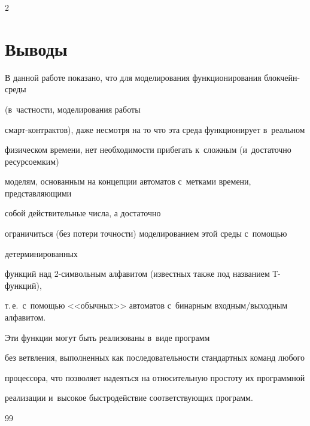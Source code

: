 \begin{multicols}{2}
\vspace*{-9pt}








\section{Выводы}





\vspace*{-2pt}





В данной работе показано, что для моделирования функционирования блок\-чейн-сре\-ды 


(в~част\-ности, моделирования работы


смарт-кон\-трак\-тов), даже несмотря на то что эта среда функционирует в~реальном


физическом времени, нет не\-об\-хо\-ди\-мости прибегать к~сложным (и~достаточно ресурсоемким)


моделям, основанным на концепции автоматов с~метками времени, представляющими 


собой действительные числа, а достаточно


ограничиться (без потери точности) моделированием этой среды с~помощью 


 детерминированных


функций над \mbox{2-сим}\-воль\-ным алфавитом (известных также под названием Т-функ\-ций),


т.\,е.\ с~по\-мощью <<обычных>> автоматов с~бинарным вход\-ным/вы\-ход\-ным алфавитом. 


Эти функции могут быть реализованы в~виде программ


без ветвления, выполненных как последовательности стандартных команд любого


процессора, что позволяет надеяться на относительную простоту их программной


реализации и~высокое быстродействие соответствующих программ.





 {\small\frenchspacing


 {%




 \begin{thebibliography}{99}






\end{thebibliography}}}
\end{multicols}

